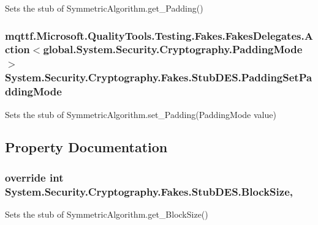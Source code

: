 Sets the stub of Symmetric\-Algorithm.\-get\-\_\-\-Padding()

\hypertarget{class_system_1_1_security_1_1_cryptography_1_1_fakes_1_1_stub_d_e_s_acdb346d383e37f377effe36bb6e4f2b8}{
\subsubsection[{Padding\-Set\-Padding\-Mode}]{\setlength{\rightskip}{0pt plus 5cm}mqttf.\-Microsoft.\-Quality\-Tools.\-Testing.\-Fakes.\-Fakes\-Delegates.\-Action$<$global.\-System.\-Security.\-Cryptography.\-Padding\-Mode$>$ System.\-Security.\-Cryptography.\-Fakes.\-Stub\-D\-E\-S.\-Padding\-Set\-Padding\-Mode}}\label{class_system_1_1_security_1_1_cryptography_1_1_fakes_1_1_stub_d_e_s_acdb346d383e37f377effe36bb6e4f2b8}


Sets the stub of Symmetric\-Algorithm.\-set\-\_\-\-Padding(\-Padding\-Mode value)



\subsection{Property Documentation}
\hypertarget{class_system_1_1_security_1_1_cryptography_1_1_fakes_1_1_stub_d_e_s_a64bd353d59072c88d74c4a4eb42fce02}{
\subsubsection[{Block\-Size}]{\setlength{\rightskip}{0pt plus 5cm}override int System.\-Security.\-Cryptography.\-Fakes.\-Stub\-D\-E\-S.\-Block\-Size\hspace{0.3cm}{\ttfamily [get]}, {\ttfamily [set]}}}\label{class_system_1_1_security_1_1_cryptography_1_1_fakes_1_1_stub_d_e_s_a64bd353d59072c88d74c4a4eb42fce02}


Sets the stub of Symmetric\-Algorithm.\-get\-\_\-\-Block\-Size()

